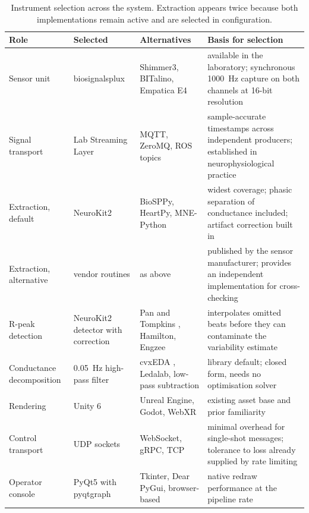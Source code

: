 \begin{table}[H]
    \centering
    \renewcommand{\arraystretch}{1.45}
    \setlength{\tabcolsep}{7pt}
    \small
    \begin{tabular}{@{}p{2.9cm}p{2.9cm}p{3.9cm}p{4.3cm}@{}}
        \toprule
        \textbf{Role} & \textbf{Selected} & \textbf{Alternatives}
            & \textbf{Basis for selection} \\
        \midrule
        Sensor unit &
            biosignalsplux &
            Shimmer3, BITalino, Empatica E4 &
            available in the laboratory; synchronous 1000~Hz capture
            on both channels at 16-bit resolution \\
        \addlinespace[7pt]
        Signal transport &
            Lab Streaming Layer \citep{kothe2019} &
            MQTT, ZeroMQ, ROS topics &
            sample-accurate timestamps across independent
            producers; established in neurophysiological practice \\
        \addlinespace[7pt]
        Extraction, default &
            NeuroKit2 \citep{makowski2021} &
            BioSPPy, HeartPy, MNE-Python &
            widest coverage; phasic separation of conductance
            included; artifact correction built in \\
        \addlinespace[7pt]
        Extraction, alternative &
            vendor routines \citep{plux2020} &
            as above &
            published by the sensor manufacturer; provides an
            independent implementation for cross-checking \\
        \addlinespace[7pt]
        R-peak detection &
            NeuroKit2 detector with correction
                \citep{lipponen2019} &
            Pan and Tompkins \citep{pantompkins1985}, Hamilton,
            Engzee &
            interpolates omitted beats before they can contaminate
            the variability estimate \\
        \addlinespace[7pt]
        Conductance decomposition &
            0.05~Hz high-pass filter &
            cvxEDA \citep{greco2016}, Ledalab, low-pass subtraction &
            library default; closed form, needs no optimisation
            solver \\
        \addlinespace[7pt]
        Rendering &
            Unity 6 \citep{unity2024} &
            Unreal Engine, Godot, WebXR &
            existing asset base and prior familiarity \\
        \addlinespace[7pt]
        Control transport &
            UDP sockets &
            WebSocket, gRPC, TCP &
            minimal overhead for single-shot messages; tolerance to
            loss already supplied by rate limiting \\
        \addlinespace[7pt]
        Operator console &
            PyQt5 with pyqtgraph &
            Tkinter, Dear PyGui, browser-based &
            native redraw performance at the pipeline rate \\
        \bottomrule
    \end{tabular}
    \caption{Instrument selection across the system. Extraction
    appears twice because both implementations remain active and
    are selected in configuration.}
    \label{tab:tools}
\end{table}

